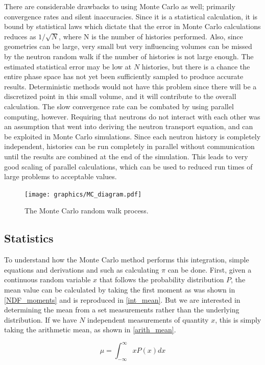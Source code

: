 There are considerable drawbacks to using Monte Carlo as well; primarily convergence rates and silent inaccuracies.  Since it is a statistical calculation, it is bound by statistical laws which dictate that the error in Monte Carlo calculations reduces as $1/\sqrt{N}$, where N is the number of histories performed.  Also, since geometries can be large, very small but very influencing volumes can be missed by the neutron random walk if the number of histories is not large enough.  The estimated statistical error may be low at $N$ histories, but there is a chance the entire phase space has not yet been sufficiently sampled to produce accurate results.  Deterministic methods would not have this problem since there will be a discretized point in this small volume, and it will contribute to the overall calculation.  The slow convergence rate can be combated by using parallel computing, however.  Requiring that neutrons do not interact with each other was an assumption that went into deriving the neutron transport equation, and can be exploited in Monte Carlo simulations.  Since each neutron history is completely independent, histories can be run completely in parallel without communication until the results are combined at the end of the simulation.  This leads to very good scaling of parallel calculations, which can be used to reduced run times of large problems to acceptable values.

\begin{figure}[h!] 
  \label{direct_samp}
  \centering
    \texttt{[image: graphics/MC\_diagram.pdf]}
     \caption{The Monte Carlo random walk process.}
\end{figure}

\subsection{Statistics}
To understand how the Monte Carlo method performs this integration, simple equations and derivations and such as calculating $\pi$ can be done.   First, given a continuous random variable $x$ that follows the probability distribution $P$, the mean value can be calculated by taking the first moment as was shown in \eqref{NDF_moments} and is reproduced in \eqref{int_mean}.  But we are interested in determining the mean from a set measurements rather than the underlying distribution.  If we have $N$ independent measurements of quantity $x$, this is simply taking the arithmetic mean, as shown in \eqref{arith_mean}.

\begin{equation}
\label{int_mean}
\mu = \int_{-\infty}^{\infty} x P(x) dx
\end{equation}

